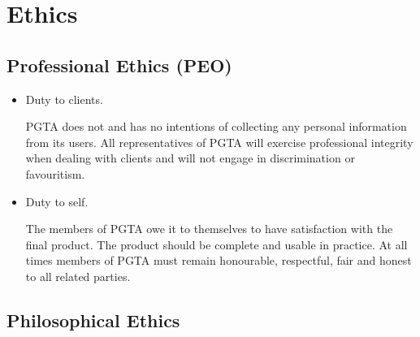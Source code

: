 \documentclass{tufte-handout}
\begin{document}
\newpage
\section{Ethics}

\subsection{Professional Ethics (PEO)}


\begin{itemize}

\item Duty to clients.

PGTA does not and has no intentions of collecting any personal information from its users. All representatives of PGTA
will exercise professional integrity when dealing with clients and will not engage in discrimination or favouritism. 

\item Duty to self.

The members of PGTA owe it to themselves to have satisfaction with the final product. The product should be complete 
and usable in practice. At all times members of PGTA must remain honourable, respectful, fair and honest to all related
parties. 

\end{itemize}

\subsection{Philosophical Ethics}

\end{document}
